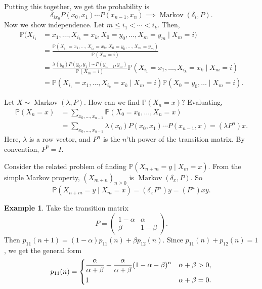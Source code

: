 \documentclass[12pt]{article}
\DeclareMathOperator{\Mkv}{Markov}
\theoremstyle{definition}
\newtheorem{example}{Example}[section]
\theoremstyle{remark}
\begin{document}
\begin{adjustbox}{minipage = \columnwidth - 25.5pt, margin=1em, frame=1pt, margin=0em}
Putting this together, we get the probability is
\[
	\delta_{ix_0}P(x_0, x_1)\cdots P(x_{n-1}, x_n) \implies \Mkv(\delta_i, P)
.\]
Now we show independence. Let $m \leq i_1 < \cdots < i_k$. Then,
\begin{align*}
	\mathbb{P}(X_{i_1} &= x_1, \ldots, X_{i_k} = x_k, X_0 = y_0, \ldots, X_m = y_m \mid X_{m} = i) \\
			   &= \frac{\mathbb{P}(X_{i_1} = x_1, \ldots, X_{i_k} = x_k, X_0 = y_0, \ldots, X_m = y_m)}{\mathbb{P}(X_m = i)} \\
			   &= \frac{\lambda(y_0) P(y_0, y_1) \cdots P(y_{m-1}, y_m)}{\mathbb{P}(X_m = i)} \mathbb{P}(X_{i_1} = x_1, \ldots, X_{i_k} = x_k \mid X_{m} = i) \\
			   &= \mathbb{P}(X_{i_1} = x_1, \ldots, X_{i_k} = x_k \mid X_{m} = i) \mathbb{P}(X_0 = y_0, \ldots \mid X_m = i).
\end{align*}

\end{adjustbox}

Let $X \sim \Mkv(\lambda, P)$. How can we find $\mathbb{P}(X_n = x)$? Evaluating,
\begin{align*}
	\mathbb{P}(X_n = x) &= \sum_{x_0, \ldots, x_{n-1}}\mathbb{P}(X_0 = x_0, \ldots, X_n = x) \\
			    &= \sum_{x_0, \ldots, x_{n-1}} \lambda(x_0) P(x_0, x_1) \cdots P(x_{n-1}, x) = (\lambda P^{n})x.
\end{align*}
Here, $\lambda$ is a row vector, and $P^{n}$ is the $n$'th power of the transition matrix. By convention, $P^{0} = I$.

Consider the related problem of finding $\mathbb{P}(X_{n+m} = y \mid X_m = x)$. From the simple Markov property, $(X_{m+n})_{n \geq 0}$ is $\Mkv(\delta_{x}, P)$. So
\[
	\mathbb{P}(X_{n+m} = y \mid X_{m} = x) = (\delta_{x} P^{n})y = (P^{n})xy
.\]

\begin{adjustbox}{minipage = \columnwidth - 25.5pt, margin=1em, frame=1pt, margin=0em}
\begin{example}
	Take the transition matrix
	\[
	P = 
	\begin{pmatrix}
		1 - \alpha & \alpha \\
		\beta & 1 - \beta
	\end{pmatrix}
	.\] 
	Then $p_{11}(n+1) = (1 - \alpha)p_{11}(n) + \beta p_{12}(n)$. Since $p_{11}(n) + p_{12}(n) = 1$, we get the general form
	\[
		p_{11}(n) =
		\begin{dcases}
			\frac{\alpha}{\alpha + \beta} + \frac{\alpha}{\alpha + \beta}(1 - \alpha - \beta)^{n} & \alpha + \beta > 0, \\
			1 & \alpha + \beta = 0.
		\end{dcases}	
	\]
\end{example}

\end{adjustbox}
\end{document}
